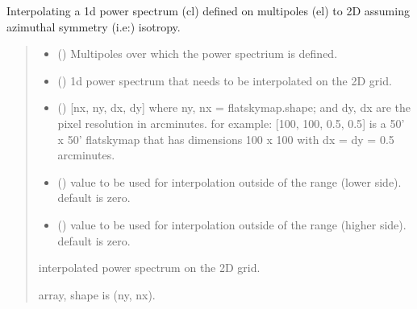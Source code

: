 \documentclass[letterpaper,10pt,english]{sphinxmanual}
\begin{document}

\begin{fulllineitems}
\label{\detokenize{flatsky:flatsky.cl_to_cl2d}}
\pysigstartsignatures
{}
\pysigstopsignatures
\sphinxAtStartPar
Interpolating a 1d power spectrum (cl) defined on multipoles (el) to 2D assuming azimuthal symmetry (i.e:) isotropy.
\begin{quote}\begin{description}
\begin{itemize}
\item {} 
\sphinxAtStartPar
{} () \textendash{} Multipoles over which the power spectrium is defined.

\item {} 
\sphinxAtStartPar
{} () \textendash{} 1d power spectrum that needs to be interpolated on the 2D grid.

\item {} 
\sphinxAtStartPar
{} () \textendash{} {[}nx, ny, dx, dy{]} where ny, nx = flatskymap.shape; and dy, dx are the pixel resolution in arcminutes.
for example: {[}100, 100, 0.5, 0.5{]} is a 50’ x 50’ flatskymap that has dimensions 100 x 100 with dx = dy = 0.5 arcminutes.

\item {} 
\sphinxAtStartPar
{} () \textendash{} value to be used for interpolation outside of the range (lower side).
default is zero.

\item {} 
\sphinxAtStartPar
{} () \textendash{} value to be used for interpolation outside of the range (higher side).
default is zero.

\end{itemize}

\sphinxAtStartPar
{} \textendash{} interpolated power spectrum on the 2D grid.

\sphinxAtStartPar
array, shape is (ny, nx).

\end{description}\end{quote}

\end{fulllineitems}
\end{document}

